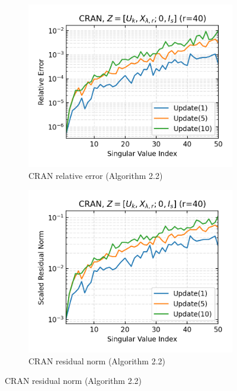 \begin{figure}
\begin{subfigure}[b]{0.48\textwidth}
  \end{subfigure}
    \begin{subfigure}[b]{0.48\textwidth}
    \centering
    \includegraphics[width=\textwidth]{figures/cran/CRAN_bcg_n_batches_10_k_dims_50_rval_40_rel_err.png}
    \caption{CRAN relative error (Algorithm 2.2)}
  \end{subfigure}
  \hfill
  \begin{subfigure}[b]{0.48\textwidth}
    \centering
    \includegraphics[width=\textwidth]{figures/cran/CRAN_bcg_n_batches_10_k_dims_50_rval_40_res_norm.png}
    \caption{CRAN residual norm (Algorithm 2.2)}
  \end{subfigure}

\end{figure}
